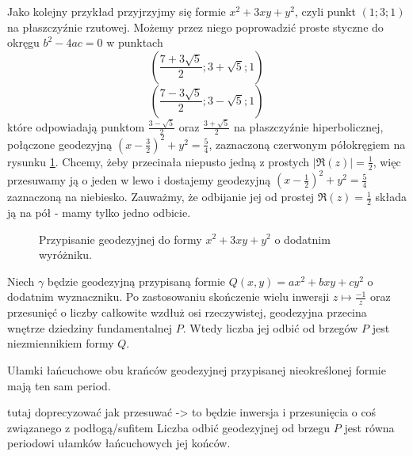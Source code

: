 \documentclass[a4paper, 12pt]{article}
\begin{document}
\begin{example}
  Jako kolejny przykład przyjrzyjmy się formie $x^2+3xy+y^2$, czyli punkt $(1;3;1)$ na płaszczyźnie rzutowej. Możemy przez niego poprowadzić proste styczne do okręgu $b^2-4ac=0$ w punktach 
  $$(\frac{7+3\sqrt{5}}{2};3+\sqrt{5};1)$$
  $$(\frac{7-3\sqrt{5}}{2};3-\sqrt{5};1)$$
  które odpowiadają punktom $\frac{3-\sqrt{5}}{2}$ oraz $\frac{3+\sqrt{5}}{2}$ na płaszczyźnie hiperbolicznej, połączone geodezyjną $(x-\frac{3}{2})^2+y^2=\frac{5}{4}$, zaznaczoną czerwonym półokręgiem na rysunku \ref{przyklad 2}. Chcemy, żeby przecinała niepusto jedną z prostych $|\Re(z)|=\frac{1}{2}$, więc przesuwamy ją o jeden w lewo i dostajemy geodezyjną $(x-\frac{1}{2})^2+y^2=\frac{5}{4}$ zaznaczoną na niebiesko. Zauważmy, że odbijanie jej od prostej $\Re(z)=\frac{1}{2}$ składa ją na pół - mamy tylko jedno odbicie.
  \begin{figure}[h]\centering
    \caption{Przypisanie geodezyjnej do formy $x^2+3xy+y^2$ o dodatnim wyróżniku.\label{przyklad 2}}
  \end{figure}
\end{example}

\begin{lemma}
  Niech $\gamma$ będzie geodezyjną przypisaną formie $Q(x,y)=ax^2+bxy+cy^2$ o dodatnim wyznaczniku. Po zastosowaniu skończenie wielu inwersji $z\mapsto\frac{-1}{z}$ oraz przesunięć o liczby całkowite wzdłuż osi rzeczywistej, geodezyjna przecina wnętrze dziedziny fundamentalnej $P$. Wtedy liczba jej odbić od brzegów $P$ jest niezmiennikiem formy $Q$.
\end{lemma}

\begin{lemma}
  Ułamki łańcuchowe obu krańców geodezyjnej przypisanej nieokreślonej formie mają ten sam period.
\end{lemma}

\begin{theorem}{\color{red}tutaj doprecyzować jak przesuwać -> to będzie inwersja i przesunięcia o coś związanego z podłogą/sufitem}
  Liczba odbić geodezyjnej od brzegu $P$ jest równa periodowi ułamków łańcuchowych jej końców.
\end{theorem}
\end{document}
